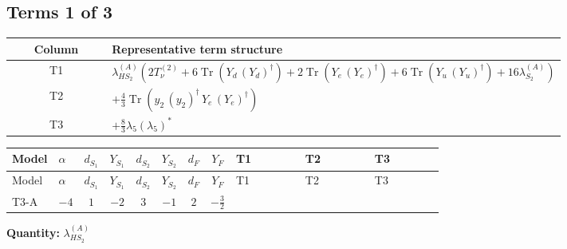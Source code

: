 \documentclass[8pt]{article}
\begin{document}
\begin{landscape}
\subsection*{Terms 1 of 3}
\begin{center}
\begin{tabular}{@{}c >{\raggedright\arraybackslash}p{0.82\linewidth}@{}}
\toprule
Column & Representative term structure \\
\midrule
T1 & \(\displaystyle {\lambda_{HS_2}^{(A)}} (2 T_{\nu}^{(2)}+6 \operatorname{Tr}\!\left({Y_d}\,\left({Y_d}\right)^{\dagger}\right)+2 \operatorname{Tr}\!\left({Y_e}\,\left({Y_e}\right)^{\dagger}\right)+6 \operatorname{Tr}\!\left({Y_u}\,\left({Y_u}\right)^{\dagger}\right)+16 {\lambda_{S_2}^{(A)}})\) \\
\midrule
T2 & \(\displaystyle +\frac{4}{3} \operatorname{Tr}\!\left({y_2}\,\left({y_2}\right)^{\dagger}\,{Y_e}\,\left({Y_e}\right)^{\dagger}\right)\) \\
\midrule
T3 & \(\displaystyle +\frac{8}{3} {\lambda_5} \left({\lambda_5}\right)^{*}\) \\
\midrule
\bottomrule
\end{tabular}
\end{center}
\smallskip
\tiny
\begin{longtable}{@{}llcccccc >{\raggedright\arraybackslash}p{0.21\linewidth} >{\raggedright\arraybackslash}p{0.21\linewidth} >{\raggedright\arraybackslash}p{0.21\linewidth}@{}}
\toprule
Model & $\alpha$ & $d_{S_1}$ & $Y_{S_1}$ & $d_{S_2}$ & $Y_{S_2}$ & $d_F$ & $Y_F$ & T1 & T2 & T3 \\
\midrule
\endfirsthead
\toprule
Model & $\alpha$ & $d_{S_1}$ & $Y_{S_1}$ & $d_{S_2}$ & $Y_{S_2}$ & $d_F$ & $Y_F$ & T1 & T2 & T3 \\
\midrule
\endhead
T3-A & $-4$ & $1$ & $-2$ & $3$ & $-1$ & $2$ & $-\frac{3}{2}$ & \scriptsize\adjustbox{max width=\linewidth}{$\begin{gathered} {\lambda_{HS_2}^{(A)}} (2 T_{\nu}^{(2)}+6 \operatorname{Tr}\!\left({Y_d}\,\left({Y_d}\right)^{\dagger}\right)+2 \operatorname{Tr}\!\left({Y_e}\,\left({Y_e}\right)^{\dagger}\right)+6 \operatorname{Tr}\!\left({Y_u}\,\left({Y_u}\right)^{\dagger}\right)+16 {\lambda_{S_2}^{(A)}})\end{gathered}$} & \scriptsize\adjustbox{max width=\linewidth}{$\begin{gathered} +\frac{4}{3} \operatorname{Tr}\!\left({y_2}\,\left({y_2}\right)^{\dagger}\,{Y_e}\,\left({Y_e}\right)^{\dagger}\right)\end{gathered}$} & \scriptsize\adjustbox{max width=\linewidth}{$\begin{gathered} +\frac{8}{3} {\lambda_5} \left({\lambda_5}\right)^{*}\end{gathered}$} \\
\midrule
\bottomrule
\end{longtable}
\clearpage
\noindent\textbf{Quantity: }$\lambda_{HS_2}^{(A)}$\par\smallskip

\end{landscape}
\end{document}
